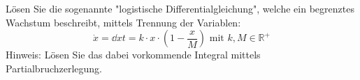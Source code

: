 \item Lösen Sie die sogenannte "logistische Differentialgleichung", welche ein begrenztes Wachstum beschreibt, mittels Trennung der Variablen: 
$$
	\dot x= \dd{x}{t} = k \cdot x \cdot (1-\frac{x}{M}) \text{ mit } k,M \in \mathbb{R}^{+}
$$
Hinweis: Lösen Sie das dabei vorkommende Integral mittels Partialbruchzerlegung.

